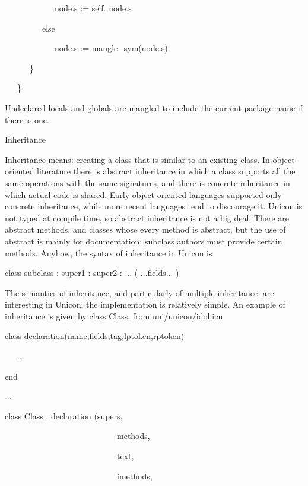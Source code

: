 {\ttfamily\mdseries
\ \ \ \ \ \ \ \ \ \ \ \ node.s := {\textquotedbl}self.{\textquotedbl} {\textbar}{\textbar} node.s}

{\ttfamily\mdseries
\ \ \ \ \ \ \ \ \ else }

{\ttfamily\mdseries
\ \ \ \ \ \ \ \ \ \ \ \ node.s := mangle\_sym(node.s)}

{\ttfamily\mdseries
\ \ \ \ \ \ \}}

{\ttfamily\mdseries
\ \ \ \}}


Undeclared locals and globals are mangled to include the current
package name if there is one.

{\sffamily
Inheritance }


Inheritance means: creating a class that is similar to an existing
class. In object-oriented literature there is {\textquotedbl}abstract
inheritance{\textquotedbl} in which a class supports all the same
operations with the same signatures, and there is concrete inheritance
in which actual code is shared. Early object-oriented languages
supported only concrete inheritance, while more recent languages tend
to discourage it. Unicon is not typed at compile time, so abstract
inheritance is not a big deal. There are abstract methods, and classes
whose every method is abstract, but the use of abstract is mainly for
documentation: subclass authors must provide certain methods. Anyhow,
the syntax of inheritance in Unicon is

{\ttfamily\mdseries
class subclass : super1 : super2 : ... ( ...fields... )}


The semantics of inheritance, and particularly of multiple
inheritance, are interesting in Unicon; the implementation is
relatively simple. An example of inheritance is given by class Class,
from uni/unicon/idol.icn

{\ttfamily\mdseries
class declaration(name,fields,tag,lptoken,rptoken)}

{\ttfamily\mdseries
\ \ \ ...}

{\ttfamily\mdseries
end}

{\ttfamily\mdseries
...}

{\ttfamily\mdseries
class Class : declaration (supers,}

{\ttfamily\mdseries
\ \ \ \ \ \ \ \ \ \ \ \ \ \ \ \ \ \ \ \ \ \ \ \ \ \ \ methods,}

{\ttfamily\mdseries
\ \ \ \ \ \ \ \ \ \ \ \ \ \ \ \ \ \ \ \ \ \ \ \ \ \ \ text,}

{\ttfamily\mdseries
\ \ \ \ \ \ \ \ \ \ \ \ \ \ \ \ \ \ \ \ \ \ \ \ \ \ \ imethods,}


